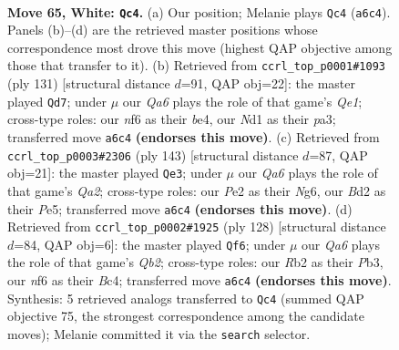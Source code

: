 \documentclass[11pt]{article}
\begin{document}
\clearpage

\begin{figure}[p]\centering
\begin{subfigure}{0.46\textwidth}\centering
\resizebox{\linewidth}{!}{%
\newchessgame
\chessboard[
  setfen={8/3qbrk1/Q4n2/P1p2p1p/3p1Pp1/8/1R1BP2P/3N2K1 w - - 5 65},
  showmover=false,
  pgfstyle=straightmove, color=movearrow, markmove={a6-c4}
]}
\caption{}
\end{subfigure}\hfill
\begin{subfigure}{0.46\textwidth}\centering
\resizebox{\linewidth}{!}{%
\newchessgame
\chessboard[
  setfen={4q1k1/5pp1/5b1p/1p3P1P/1P2B3/P3RQPK/8/2r5 b - - 26 66},
  showmover=false,
  pgfstyle=straightmove, color=movearrow, markmove={e8-d7}
]}
\caption{}
\end{subfigure}
\\[4pt]
\begin{subfigure}{0.46\textwidth}\centering
\resizebox{\linewidth}{!}{%
\newchessgame
\chessboard[
  setfen={8/q4pk1/6n1/1Q2p3/1P2P1Pp/2P4P/3r1NP1/5RK1 b - - 0 72},
  showmover=false,
  pgfstyle=straightmove, color=movearrow, markmove={a7-e3}
]}
\caption{}
\end{subfigure}\hfill
\begin{subfigure}{0.46\textwidth}\centering
\resizebox{\linewidth}{!}{%
\newchessgame
\chessboard[
  setfen={3R4/1b4rk/6p1/2q2p1p/1pB1p3/1P2P2P/1Q4P1/7K w - - 4 65},
  showmover=false,
  pgfstyle=straightmove, color=movearrow, markmove={b2-f6}
]}
\caption{}
\end{subfigure}
\caption{\textbf{Move 65, White: \texttt{Qc4}.} (a) Our position; Melanie plays \texttt{Qc4} (\texttt{a6c4}). Panels (b)--(d) are the retrieved master positions whose correspondence most drove this move (highest QAP objective among those that transfer to it). (b) Retrieved from \texttt{ccrl\_top\_p0001\#1093} (ply 131) [structural distance $d$=91, QAP obj=22]: the master played \texttt{Qd7}; under $\mu$ our \emph{Qa6} plays the role of that game's \emph{Qe1}; cross-type roles: our \emph{n}f6 as their \emph{b}e4, our \emph{N}d1 as their \emph{p}a3; transferred move \texttt{a6c4} \textbf{(endorses this move)}. (c) Retrieved from \texttt{ccrl\_top\_p0003\#2306} (ply 143) [structural distance $d$=87, QAP obj=21]: the master played \texttt{Qe3}; under $\mu$ our \emph{Qa6} plays the role of that game's \emph{Qa2}; cross-type roles: our \emph{P}e2 as their \emph{N}g6, our \emph{B}d2 as their \emph{P}e5; transferred move \texttt{a6c4} \textbf{(endorses this move)}. (d) Retrieved from \texttt{ccrl\_top\_p0002\#1925} (ply 128) [structural distance $d$=84, QAP obj=6]: the master played \texttt{Qf6}; under $\mu$ our \emph{Qa6} plays the role of that game's \emph{Qb2}; cross-type roles: our \emph{R}b2 as their \emph{P}b3, our \emph{n}f6 as their \emph{B}c4; transferred move \texttt{a6c4} \textbf{(endorses this move)}. Synthesis: 5 retrieved analogs transferred to \texttt{Qc4} (summed QAP objective 75, the strongest correspondence among the candidate moves); Melanie committed it via the \texttt{search} selector.}
\label{fig:thought-m128}
\end{figure}
\end{document}
